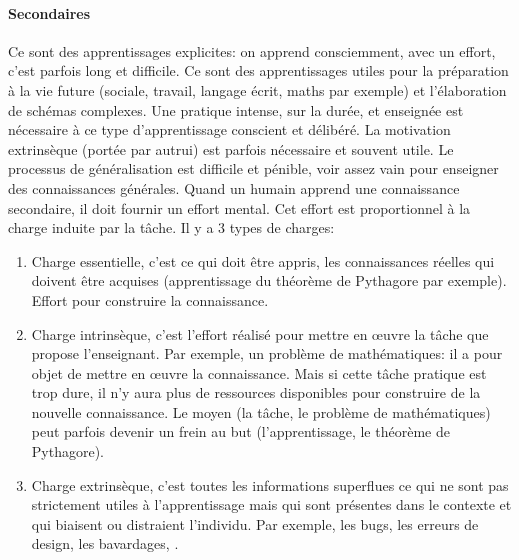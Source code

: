             \paragraph{Secondaires}
                Ce sont des apprentissages explicites: on apprend consciemment, avec un effort, c’est parfois long et difficile. Ce sont des apprentissages utiles pour la préparation à la vie future (sociale, travail, langage écrit, maths par exemple) et l'élaboration de schémas complexes. Une pratique intense, sur la durée, et enseignée est nécessaire à ce type d'apprentissage conscient et délibéré. La motivation extrinsèque (portée par autrui) est parfois nécessaire et souvent utile. Le processus de généralisation est difficile et pénible, voir assez vain pour enseigner des connaissances générales.
            Quand un humain apprend une connaissance secondaire, il doit fournir un effort mental. Cet effort est proportionnel à la charge induite par la tâche. Il y a 3 types de charges:
            \begin{enumerate}\myItemStyle
                \item Charge essentielle, c'est ce qui doit être appris, les connaissances réelles qui doivent être acquises (apprentissage du théorème de Pythagore par exemple). Effort pour construire la connaissance.
                \item Charge intrinsèque, c'est l'effort réalisé pour mettre en œuvre la tâche que propose l'enseignant. Par exemple, un problème de mathématiques: il a pour objet de  mettre en œuvre la connaissance. Mais si cette tâche pratique est trop dure, il n’y aura plus de ressources disponibles pour construire de la nouvelle connaissance. Le moyen (la tâche, \eg le problème de mathématiques) peut parfois devenir un frein au but (l’apprentissage, \eg le théorème de Pythagore).
                \item Charge extrinsèque, c'est toutes les informations superflues ce qui ne sont pas strictement utiles à l’apprentissage mais qui sont présentes dans le contexte et qui biaisent ou distraient l'individu. Par exemple, les bugs, les erreurs de design, les bavardages, \etc.
            \end{enumerate}
